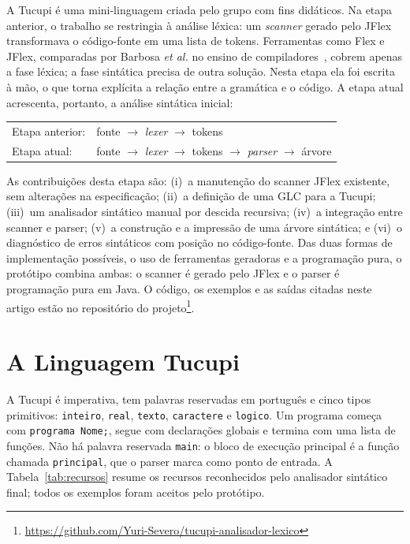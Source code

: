 \documentclass[conference,a4paper]{IEEEtran}
\newcommand{\cod}[1]{\texttt{#1}}
\begin{document}
A Tucupi é uma mini-linguagem criada pelo grupo com fins didáticos. Na etapa anterior, o trabalho se restringia à análise léxica: um \emph{scanner} gerado pelo JFlex~\cite{jflexmanual} transformava o código-fonte em uma lista de tokens. Ferramentas como Flex e JFlex, comparadas por Barbosa \emph{et al.} no ensino de compiladores~\cite{barbosa2019}, cobrem apenas a fase léxica; a fase sintática precisa de outra solução. Nesta etapa ela foi escrita à mão, o que torna explícita a relação entre a gramática e o código. A etapa atual acrescenta, portanto, a análise sintática inicial:
\begin{center}
\small
\begin{tabular}{@{}ll@{}}
Etapa anterior: & fonte $\rightarrow$ \emph{lexer} $\rightarrow$ tokens\\
Etapa atual: & fonte $\rightarrow$ \emph{lexer} $\rightarrow$ tokens $\rightarrow$ \emph{parser} $\rightarrow$ árvore
\end{tabular}
\end{center}

As contribuições desta etapa são: (i)~a manutenção do scanner JFlex existente, sem alterações na especificação; (ii)~a definição de uma GLC para a Tucupi; (iii)~um analisador sintático manual por descida recursiva; (iv)~a integração entre scanner e parser; (v)~a construção e a impressão de uma árvore sintática; e (vi)~o diagnóstico de erros sintáticos com posição no código-fonte. Das duas formas de implementação possíveis, o uso de ferramentas geradoras e a programação pura, o protótipo combina ambas: o scanner é gerado pelo JFlex e o parser é programação pura em Java. O código, os exemplos e as saídas citadas neste artigo estão no repositório do projeto\footnote{\url{https://github.com/Yuri-Severo/tucupi-analisador-lexico}}.

\section{A Linguagem Tucupi}

A Tucupi é imperativa, tem palavras reservadas em português e cinco tipos primitivos: \cod{inteiro}, \cod{real}, \cod{texto}, \cod{caractere} e \cod{logico}. Um programa começa com \cod{programa Nome;}, segue com declarações globais e termina com uma lista de funções. Não há palavra reservada \cod{main}: o bloco de execução principal é a função chamada \cod{principal}, que o parser marca como ponto de entrada. A Tabela~\ref{tab:recursos} resume os recursos reconhecidos pelo analisador sintático final; todos os exemplos foram aceitos pelo protótipo.
\end{document}
